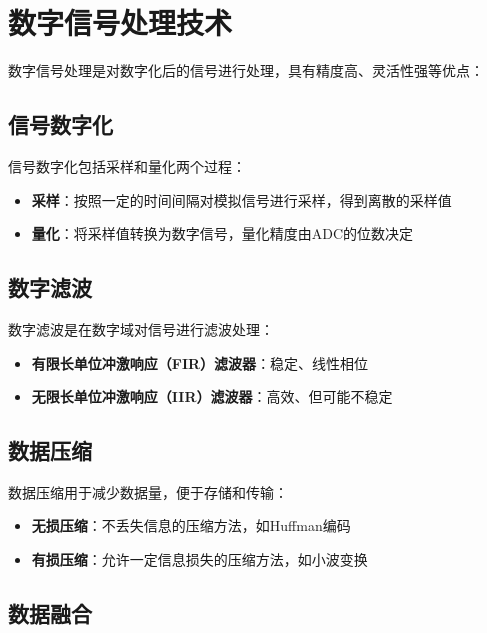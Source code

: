 \documentclass[12pt,UTF8]{ctexbook}
\begin{document}
\section{数字信号处理技术}

数字信号处理是对数字化后的信号进行处理，具有精度高、灵活性强等优点：

\subsection{信号数字化}

信号数字化包括采样和量化两个过程：

\begin{itemize}[leftmargin=2cm]
	\item \textbf{采样}：按照一定的时间间隔对模拟信号进行采样，得到离散的采样值
	\item \textbf{量化}：将采样值转换为数字信号，量化精度由ADC的位数决定
\end{itemize}

\subsection{数字滤波}

数字滤波是在数字域对信号进行滤波处理：

\begin{itemize}[leftmargin=2cm]
	\item \textbf{有限长单位冲激响应（FIR）滤波器}：稳定、线性相位
	\item \textbf{无限长单位冲激响应（IIR）滤波器}：高效、但可能不稳定
\end{itemize}

\subsection{数据压缩}

数据压缩用于减少数据量，便于存储和传输：

\begin{itemize}[leftmargin=2cm]
	\item \textbf{无损压缩}：不丢失信息的压缩方法，如Huffman编码
	\item \textbf{有损压缩}：允许一定信息损失的压缩方法，如小波变换
\end{itemize}

\subsection{数据融合}
\end{document}
